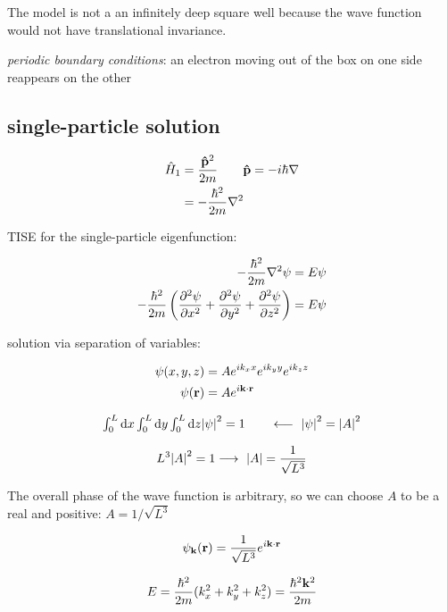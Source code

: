 \documentclass[10pt, a4paper, twocolumn]{article}
\newcommand{\deff}[1]{\par \noindent \textit{#1}: }
\newcommand{\arr}{\ensuremath{\longrightarrow\ }}
\newcommand{\larr}{\ensuremath{\longleftarrow\ }}
\begin{document}
The model is not a an infinitely deep square well because the wave function would not have translational invariance.

\deff{periodic boundary conditions}
an electron moving out of the box on one side reappears on the other

\subsection{single-particle solution}

\begin{equation*}
\begin{aligned}
\hat H _1 &= \frac{\vb{\hat p} ^2}{2m}
\qquad \vb{\hat p} = - i \hbar \nabla
\\ &= - \frac{\hbar ^2}{2m} \laplacian
\end{aligned}
\end{equation*}

TISE for the single-particle eigenfunction:

\begin{equation*}
\begin{aligned}
- \frac{\hbar ^2}{2m} \laplacian{\psi} &= E \psi
\\ - \frac{\hbar ^2}{2m}
\left( \pdv[2]{\psi}{x} + \pdv[2]{\psi}{y} + 
\pdv[2]{\psi}{z} \right) &= E \psi
\end{aligned}
\end{equation*}

solution via separation of variables:

\begin{equation*}
\begin{aligned}
\psi (x,y,z) &= A e^{i k_x x} e^{i k_y y} e^{i k_z z}
\\ \psi (\vb r) &= A e^{i \vb k \cdot \vb r}
\end{aligned}
\end{equation*}

\[ \textstyle \int _0^L \dd x \int _0^L \dd y
\int _0^L \dd z \abs{\psi}^2 = 1
\qquad \larr \abs{\psi}^2 = \abs{A}^2 \]

\[L^3 \abs{A}^2 = 1 \arr \abs{A} = \frac{1}{\sqrt{L^3}} \]

The overall phase of the wave function is arbitrary, so we can choose $A$ to be a real and positive:
$A = 1/\sqrt{L^3}$

\[ \psi _{\vb k} (\vb r) = \frac{1}{\sqrt{L^3}}
e^{i \vb k \cdot \vb r} \]

\[ E = \frac{\hbar ^2}{2m} (k_x^2 + k_y^2 + k_z^2)
= \frac{\hbar ^2 \vb k^2}{2m} \]
\end{document}
